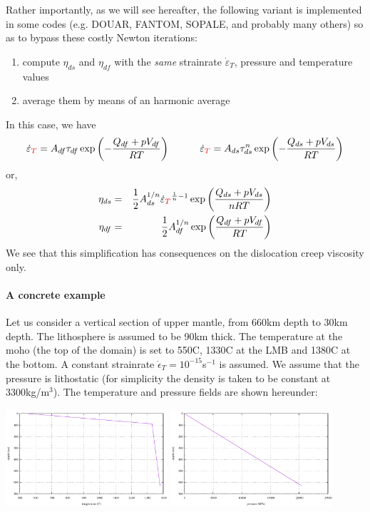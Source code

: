 \begin{itemize}
Rather importantly, as we will see hereafter, the following variant is implemented 
in some codes (e.g. DOUAR, FANTOM, SOPALE, and probably many others) 
so as to bypass these costly Newton iterations:
\begin{enumerate}
\item compute $\eta_{ds}$ and $\eta_{df}$ with the {\it same} strainrate $\dot\varepsilon_T$, 
pressure and temperature values
\item average them by means of an harmonic average
\end{enumerate}
In this case, we have
\[
\dot{\varepsilon}_{\color{red} T}= 
A_{df} \tau_{df} \exp\left(-\frac{Q_{df}+pV_{df}}{RT}\right)
\quad\quad\quad
\dot{\varepsilon}_{\color{red} T}= 
A_{ds} \tau_{ds}^n \exp\left(-\frac{Q_{ds}+pV_{ds}}{RT}\right)
\]
or, 
\begin{eqnarray}
\eta_{ds} 
&=& \frac{1}{2} A_{ds}^{1/n} \dot\varepsilon_{\color{red}T}^{\frac{1}{n}-1} \exp \left(\frac{Q_{ds}+pV_{ds}}{nRT}\right) \\
\eta_{df} 
&=& \frac{1}{2} A_{df}^{1/n}  \exp \left(\frac{Q_{df}+pV_{df}}{RT}\right) 
\end{eqnarray}
We see that this simplification has consequences on the dislocation creep viscosity only.


\paragraph{A concrete example}
Let us consider a vertical section of upper mantle, from 660km depth to 30km depth.
The lithosphere is assumed to be 90km thick. The temperature at the moho (the top
of the domain) is set to 550C, 1330C at the LMB and 1380C at the bottom.
A constant strainrate $\dot{\epsilon}_T=10^{-15}$s$^{-1}$ is assumed. 
We assume that the pressure is lithostatic (for simplicity 
the density is taken to be constant at 3300kg/m$^3$).
The temperature and pressure fields are shown hereunder:
\begin{center}
\includegraphics[width=6cm]{images/rheology/effvisc/temperature.pdf}
\includegraphics[width=6cm]{images/rheology/effvisc/pressure.pdf}
\end{center}


\end{itemize}
